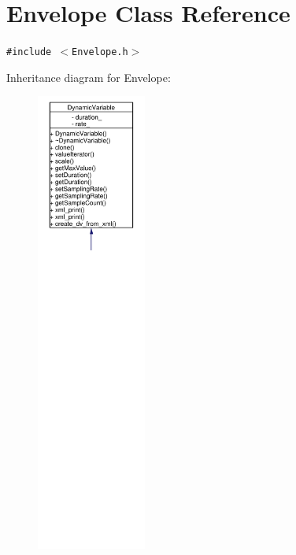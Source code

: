 \hypertarget{classEnvelope}{
\section{Envelope Class Reference}
\label{classEnvelope}
}
{\tt \#include $<$Envelope.h$>$}

Inheritance diagram for Envelope:\begin{figure}[H]
\begin{center}
\leavevmode
\includegraphics[width=102pt]{classEnvelope__inherit__graph}
\end{center}
\end{figure}
